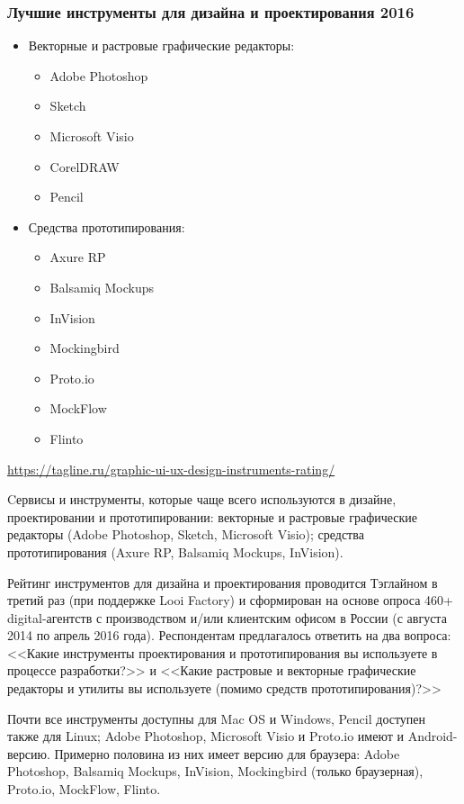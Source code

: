 \documentclass{../industrial-development}
\begin{document}
\begin{frame} \frametitle{Лучшие инструменты для дизайна и проектирования 2016}
  \begin{itemize}
   \item Векторные и растровые графические редакторы:
     \begin{itemize}
      \item Adobe Photoshop
      \item Sketch
      \item Microsoft Visio
      \item CorelDRAW
      \item Pencil
     \end{itemize}
   \item Средства прототипирования:
     \begin{itemize}
      \item Axure RP
      \item Balsamiq Mockups
      \item InVision
      \item Mockingbird
      \item Proto.io
      \item MockFlow
      \item Flinto 
     \end{itemize}
  \end{itemize}
  
  \url{https://tagline.ru/graphic-ui-ux-design-instruments-rating/}
\end{frame}

Cервисы и инструменты, которые чаще всего используются в дизайне, проектировании и прототипировании: векторные и растровые графические редакторы (Adobe Photoshop, Sketch, Microsoft Visio); средства прототипирования (Axure RP, Balsamiq Mockups, InVision).

Рейтинг инструментов для дизайна и проектирования проводится Тэглайном в третий раз (при поддержке Looi Factory) и сформирован на основе опроса 460+ digital-агентств с производством и/или клиентским офисом в России (с августа 2014 по апрель 2016 года). Респондентам предлагалось ответить на два вопроса: <<Какие инструменты проектирования и прототипирования вы используете в процессе разработки?>> и <<Какие растровые и векторные графические редакторы и утилиты вы используете (помимо средств прототипирования)?>>

Почти все инструменты доступны для Mac OS и Windows, Pencil доступен также для Linux; Adobe Photoshop, Microsoft Visio и Proto.io имеют и Android-версию. Примерно половина из них имеет версию для браузера: Adobe Photoshop, Balsamiq Mockups, InVision, Mockingbird (только браузерная), Proto.io, MockFlow, Flinto.
\end{document}
